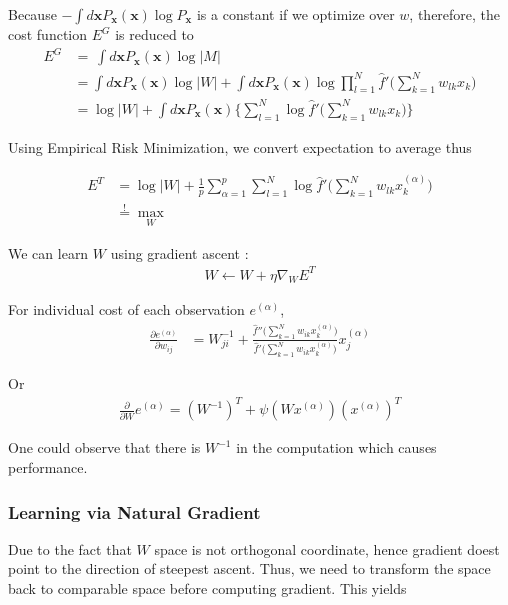Because $- \int d\boldsymbol{x} P_{\boldsymbol{x}}(\boldsymbol{x})\log P_{\boldsymbol{x}}$ is a constant if we optimize over $w$, therefore, the cost function $E^G$ is reduced to 
\begin{align*}
	E^G &= 	\ 	\int d\boldsymbol{x} P_{\boldsymbol{x}}(\boldsymbol{x})\log |M| \\
	&= 	\int d\boldsymbol{x} P_{\boldsymbol{x}}(\boldsymbol{x})\log |W| + 	\int d \boldsymbol{x} P_{\boldsymbol{x}}(\boldsymbol{x})\log  \prod_{l=1}^{N} \hat{f}' \bigg (\sum_{k=1}^{N} w_{lk}x_k \bigg ) \\
	&= \log |W| + \int d \boldsymbol{x} P_{\boldsymbol{x}}(\boldsymbol{x}) \Bigg\{ \sum_{l=1}^{N} \log\hat{f}'\bigg (\sum_{k=1}^{N} w_{lk}x_k \bigg ) \Bigg\}
\end{align*}

Using Empirical Risk Minimization, we convert expectation to average  thus 

\begin{align*}
	E^T &= \log |W| + 
	\frac{1}{p} \sum_{\alpha=1}^{p} \sum_{l=1}^{N} \log\hat{f} ' \bigg (\sum_{k=1}^{N} w_{lk}x_k^{(\alpha)} \bigg )  \\
	&\stackrel{!}{=} \max_{W}
\end{align*}

We can learn $W$ using gradient ascent :
\begin{align*}
  W \leftarrow W + \eta \nabla_{W} E^T
\end{align*}

For individual cost of each observation $e^{(\alpha)}$, 
\begin{align*}
	\frac{\partial e^{(\alpha)} }{\partial w_{ij} } &= W ^{-1}_{ji} + \frac{\hat{f} '' \bigg (\sum_{k=1}^{N} w_{ik}x_k^{(\alpha)} \bigg )}{\hat{f} ' \bigg (\sum_{k=1}^{N} w_{ik}x_k^{(\alpha)} \bigg ) } x_j^{(\alpha)}
\end{align*}

Or
\begin{align*}
 \frac{ \partial }{\partial W} e^{(\alpha)} = 	(W^{-1})^T + \psi(Wx^{(\alpha)}) (x^{(\alpha)})^T
\end{align*}


One could observe that there is $W^{-1}$ in the computation which causes performance. 
\subsubsection{Learning via Natural Gradient}
Due to the fact that $W$ space is not  orthogonal coordinate, hence gradient doest point to the direction of steepest ascent. Thus, we need to transform the space back to comparable space before computing gradient. This yields 

